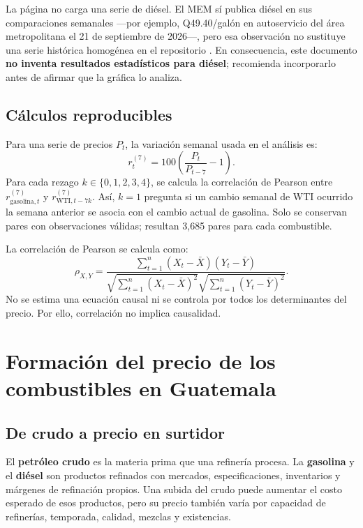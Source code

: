 \documentclass[11pt,letterpaper]{article}
\begin{document}
La página no carga una serie de diésel. El MEM sí publica diésel en sus comparaciones semanales ---por ejemplo, Q49.40/galón en autoservicio del área metropolitana el 21 de septiembre de 2026---, pero esa observación no sustituye una serie histórica homogénea en el repositorio \parencite{memPrecios2026}. En consecuencia, este documento \textbf{no inventa resultados estadísticos para diésel}; recomienda incorporarlo antes de afirmar que la gráfica lo analiza.

\subsection{Cálculos reproducibles}
Para una serie de precios $P_t$, la variación semanal usada en el análisis es:
\begin{equation}
 r_t^{(7)} = 100\left(\frac{P_t}{P_{t-7}}-1\right).
\end{equation}
Para cada rezago $k\in\{0,1,2,3,4\}$, se calcula la correlación de Pearson entre $r^{(7)}_{\text{gasolina},t}$ y $r^{(7)}_{\text{WTI},t-7k}$. Así, $k=1$ pregunta si un cambio semanal de WTI ocurrido la semana anterior se asocia con el cambio actual de gasolina. Solo se conservan pares con observaciones válidas; resultan 3,685 pares para cada combustible.

La correlación de Pearson se calcula como:
\begin{equation}
 \rho_{X,Y}=\frac{\sum_{t=1}^n(X_t-\bar X)(Y_t-\bar Y)}{\sqrt{\sum_{t=1}^n(X_t-\bar X)^2}\sqrt{\sum_{t=1}^n(Y_t-\bar Y)^2}}.
\end{equation}
No se estima una ecuación causal ni se controla por todos los determinantes del precio. Por ello, correlación no implica causalidad.

\section{Formación del precio de los combustibles en Guatemala}
\subsection{De crudo a precio en surtidor}
El \textbf{petróleo crudo} es la materia prima que una refinería procesa. La \textbf{gasolina} y el \textbf{diésel} son productos refinados con mercados, especificaciones, inventarios y márgenes de refinación propios. Una subida del crudo puede aumentar el costo esperado de esos productos, pero su precio también varía por capacidad de refinerías, temporada, calidad, mezclas y existencias.
\end{document}
